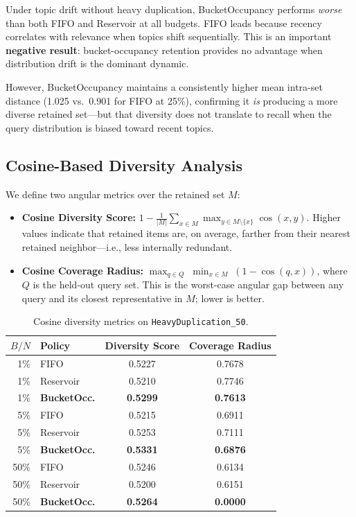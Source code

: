 \documentclass[conference]{IEEEtran}
\begin{document}
Under topic drift without heavy duplication, BucketOccupancy performs
\emph{worse} than both FIFO and Reservoir at all budgets. FIFO leads
because recency correlates with relevance when topics shift
sequentially. This is an important \textbf{negative result}:
bucket-occupancy retention provides no advantage when distribution
drift is the dominant dynamic.

However, BucketOccupancy maintains a consistently higher mean intra-set
distance (1.025 vs.\ 0.901 for FIFO at 25\%), confirming it \emph{is}
producing a more diverse retained set---but that diversity does not
translate to recall when the query distribution is biased toward recent
topics.

\subsection{Cosine-Based Diversity Analysis}

We define two angular metrics over the retained set $M$:
\begin{itemize}
\item \textbf{Cosine Diversity Score:}
      $1 - \frac{1}{|M|}\sum_{x \in M}\max_{y \in M \setminus \{x\}}
      \cos(x,y)$. Higher values indicate that retained items are, on
      average, farther from their nearest retained neighbor---i.e., less
      internally redundant.
\item \textbf{Cosine Coverage Radius:}
      $\max_{q \in Q}\;\min_{x \in M}\;(1-\cos(q,x))$, where $Q$ is the
      held-out query set. This is the worst-case angular gap between any
      query and its closest representative in $M$; lower is better.
\end{itemize}

\begin{table}[h]
\centering
\caption{Cosine diversity metrics on \texttt{HeavyDuplication\_50}.}
\label{tab:cosine}
\begin{tabular}{@{}rlcc@{}}
\toprule
$B/N$ & Policy & Diversity Score & Coverage Radius \\
\midrule
 1\% & FIFO           & 0.5227 & 0.7678 \\
 1\% & Reservoir      & 0.5210 & 0.7746 \\
 1\% & \textbf{BucketOcc.} & \textbf{0.5299} & \textbf{0.7613} \\
\midrule
 5\% & FIFO           & 0.5215 & 0.6911 \\
 5\% & Reservoir      & 0.5253 & 0.7111 \\
 5\% & \textbf{BucketOcc.} & \textbf{0.5331} & \textbf{0.6876} \\
\midrule
50\% & FIFO           & 0.5246 & 0.6134 \\
50\% & Reservoir      & 0.5200 & 0.6151 \\
50\% & \textbf{BucketOcc.} & \textbf{0.5264} & \textbf{0.0000} \\
\bottomrule
\end{tabular}
\end{table}
\end{document}
